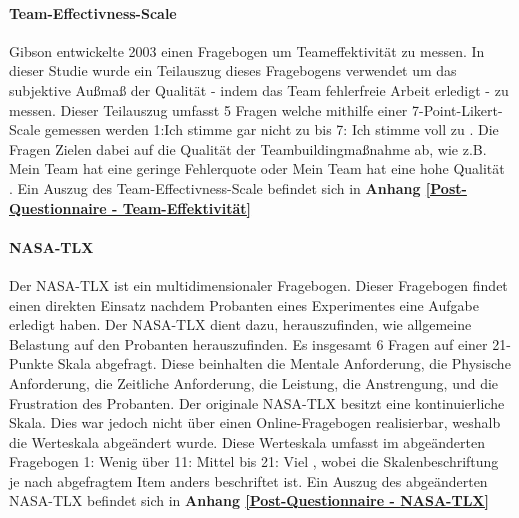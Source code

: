 \documentclass[a4paper,11pt]{article}%
\renewcommand{\\}{\vspace*{0.5\baselineskip} \newline}
\begin{document}
		\paragraph{Team-Effectivness-Scale}
Gibson \citep[p.469]{gibson2003team} entwickelte 2003 einen Fragebogen um Teameffektivität zu messen. In dieser Studie wurde ein Teilauszug dieses Fragebogens verwendet um das subjektive Außmaß der Qualität - indem das Team fehlerfreie Arbeit erledigt - zu messen. Dieser Teilauszug umfasst 5 Fragen welche mithilfe einer 7-Point-Likert-Scale gemessen werden \dq{}1:Ich stimme gar nicht zu \dq{} bis \dq{}7: Ich stimme voll zu \dq{}. Die Fragen Zielen dabei auf die Qualität der Teambuildingmaßnahme ab, wie z.B. \dq{}Mein Team hat eine geringe Fehlerquote \dq{} oder \dq{}Mein Team hat eine hohe Qualität \dq{}. 
\\Ein Auszug des Team-Effectivness-Scale befindet sich in \textbf{Anhang \ref{Post-Questionnaire - Team-Effektivität}}


		\paragraph{NASA-TLX}
Der NASA-TLX ist ein multidimensionaler Fragebogen. Dieser Fragebogen findet einen direkten Einsatz nachdem Probanten eines Experimentes eine Aufgabe erledigt haben. Der NASA-TLX dient dazu, herauszufinden, wie allgemeine Belastung auf den Probanten herauszufinden.
Es insgesamt 6 Fragen auf einer 21-Punkte Skala abgefragt. Diese beinhalten die Mentale Anforderung, die Physische Anforderung, die Zeitliche Anforderung, die Leistung, die Anstrengung, und die Frustration des Probanten. \cite{NASATLX}
Der originale NASA-TLX besitzt eine kontinuierliche Skala. Dies war jedoch nicht über einen Online-Fragebogen realisierbar, weshalb die Werteskala abgeändert wurde. Diese Werteskala umfasst im abgeänderten Fragebogen \dq{}1: Wenig \dq{} über \dq{}11: Mittel \dq{} bis \dq{}21: Viel \dq{}, wobei die Skalenbeschriftung je nach abgefragtem Item anders beschriftet ist.
\\Ein Auszug des abgeänderten NASA-TLX befindet sich in \textbf{Anhang \ref{Post-Questionnaire - NASA-TLX}}
\end{document}
